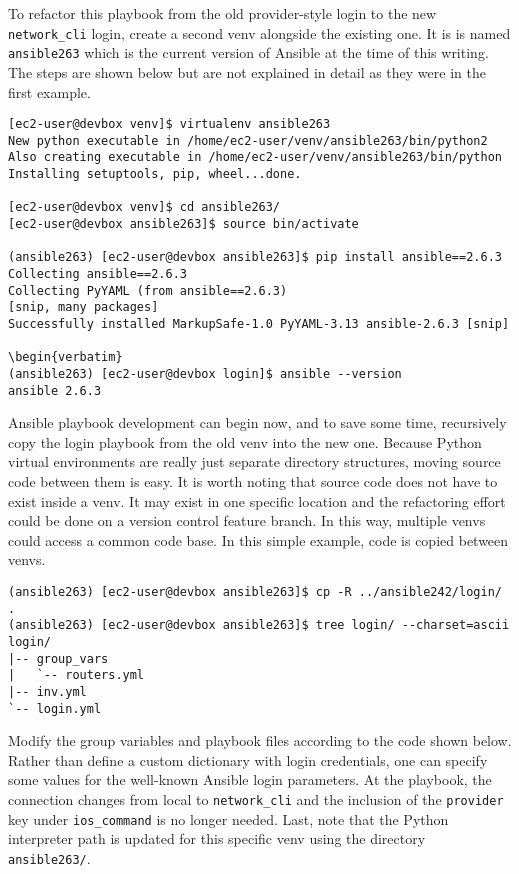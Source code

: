 To refactor this playbook from the old provider-style login to the new
\verb|network_cli| login, create a second venv alongside the existing one. It is
is named \verb|ansible263| which is the current version of Ansible at the time of
this writing. The steps are shown below but are not explained in detail as
they were in the first example.

\begin{verbatim}
[ec2-user@devbox venv]$ virtualenv ansible263
New python executable in /home/ec2-user/venv/ansible263/bin/python2
Also creating executable in /home/ec2-user/venv/ansible263/bin/python
Installing setuptools, pip, wheel...done.

[ec2-user@devbox venv]$ cd ansible263/
[ec2-user@devbox ansible263]$ source bin/activate

(ansible263) [ec2-user@devbox ansible263]$ pip install ansible==2.6.3
Collecting ansible==2.6.3
Collecting PyYAML (from ansible==2.6.3)
[snip, many packages]
Successfully installed MarkupSafe-1.0 PyYAML-3.13 ansible-2.6.3 [snip]

\begin{verbatim}
(ansible263) [ec2-user@devbox login]$ ansible --version
ansible 2.6.3
\end{verbatim}

Ansible playbook development can begin now, and to save some time, recursively
copy the login playbook from the old venv into the new one. Because Python
virtual environments are really just separate directory structures, moving
source code between them is easy. It is worth noting that source code does not
have to exist inside a venv. It may exist in one specific location and the
refactoring effort could be done on a version control feature branch. In this
way, multiple venvs could access a common code base. In this simple example,
code is copied between venvs.

\begin{verbatim}
(ansible263) [ec2-user@devbox ansible263]$ cp -R ../ansible242/login/ .
(ansible263) [ec2-user@devbox ansible263]$ tree login/ --charset=ascii
login/
|-- group_vars
|   `-- routers.yml
|-- inv.yml
`-- login.yml
\end{verbatim}

Modify the group variables and playbook files according to the code shown
below. Rather than define a custom dictionary with login credentials, one can
specify some values for the well-known Ansible login parameters. At the
playbook, the connection changes from local to \verb|network_cli| and the inclusion
of the \verb|provider| key under \verb|ios_command| is no longer needed. Last,
note that the Python interpreter path is updated for this specific venv using
the directory \verb|ansible263/|.

